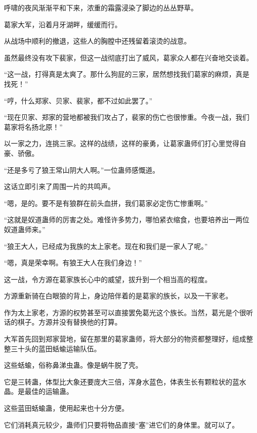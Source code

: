 
\begin{this_body}



呼啸的夜风渐渐平和下来，浓重的霜露浸染了脚边的丛丛野草。

葛家大军，沿着月牙湖畔，缓缓而行。

从战场中顺利的撤退，这些人的胸膛中还残留着滚烫的战意。

虽然最终没有攻下裴家，但这一战彻底打出了威风，葛家众人都在兴奋地交谈着。

“这一战，打得真是太爽了。那什么狗屁的三家，居然想找我们葛家的麻烦，真是找死！”

“哼，什么郑家、贝家、裴家，都不过如此罢了。”

“现在贝家、郑家的营地都被我们攻占了，裴家的伤亡也很惨重。今夜一战，我们葛家将名扬北原！”

以一家之力，连挑三家。这样的战绩，这样的豪勇，让葛家蛊师们打心里觉得自豪、骄傲。

“还是多亏了狼王常山阴大人啊。”一位蛊师感慨道。

这话立即引来了周围一片的共鸣声。

“嗯，是的。要不是有狼群在前头血拼，我们葛家必定伤亡惨重啊。”

“这就是奴道蛊师的厉害之处。难怪许多势力，哪怕紧衣缩食，也要培养出一两位奴道蛊师来。”

“狼王大人，已经成为我族的太上家老。现在和我们是一家人了呢。”

“嗯，真是荣幸啊。有狼王大人在我们身边！”

这一战，令方源在葛家族长心中的威望，拔升到一个相当高的程度。

方源重新骑在白眼狼的背上，身边陪伴着的是葛家的族长，以及一干家老。

作为太上家老，方源的权势甚至可以直接罢免葛光这个族长。当然，葛光是个很听话的棋子。方源并没有替换他的打算。

大军首先回到郑家营地，留在那里的葛家蛊师，将大部分的物资都整理好，组成整整三十头的蓝田蛞蝓运输队伍。

这些蛞蝓，俗称鼻涕虫蛊。像是蜗牛脱了壳。

它是三转蛊，体型比大象还要庞大三倍，浑身水蓝色，体表生长有颗粒状的蓝水晶。是最佳的运输蛊。

这些蓝田蛞蝓蛊，使用起来也十分方便。

它们消耗真元较少，蛊师们只要将物品直接“塞”进它们的身体里。就可以了。


\end{this_body}
